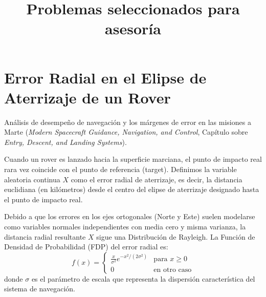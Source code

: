 \documentclass{article}
\title{Problemas seleccionados para asesoría}
\author{}
\date{}
\begin{document}
\maketitle


\section{Error Radial en el Elipse de Aterrizaje de un Rover}

Análisis de desempeño de navegación y los márgenes de error en las misiones a Marte (\textit{Modern Spacecraft Guidance, Navigation, and Control}, Capítulo sobre \textit{Entry, Descent, and Landing Systems}).


Cuando un rover es lanzado hacia la superficie marciana, el punto de impacto real rara vez coincide con el punto de referencia (target). Definimos la variable aleatoria continua $X$ como el error radial de aterrizaje, es decir, la distancia euclidiana (en kilómetros) desde el centro del elipse de aterrizaje designado hasta el punto de impacto real.

Debido a que los errores en los ejes ortogonales (Norte y Este) suelen modelarse como variables normales independientes con media cero y misma varianza, la distancia radial resultante $X$ sigue una Distribución de Rayleigh. La Función de Densidad de Probabilidad (FDP) del error radial es:
$$ f(x) = \begin{cases} \frac{x}{\sigma^2} e^{-x^2 / (2\sigma^2)} & \text{para } x \ge 0 \\ 0 & \text{en otro caso} \end{cases} $$
donde $\sigma$ es el parámetro de escala que representa la dispersión característica del sistema de navegación.
\end{document}
